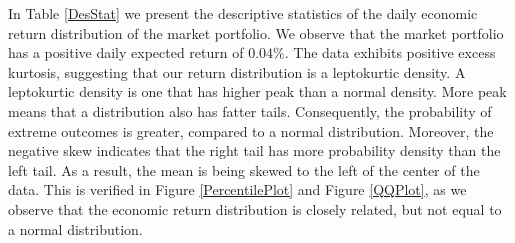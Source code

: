 In Table \ref{DesStat} we present the descriptive statistics of the daily economic return distribution of the market portfolio. We observe that the market portfolio has a positive daily expected return of $0.04\%$. The data exhibits positive excess kurtosis, suggesting that our return distribution is a leptokurtic density. A leptokurtic density is one that has higher peak than a normal density. More peak means that a distribution also has fatter tails. Consequently, the probability of extreme outcomes is greater, compared to a normal distribution. Moreover, the negative skew indicates that the right tail has more probability density than the left tail. As a result, the mean is being skewed to the left of the center of the data. This is verified in Figure \ref{PercentilePlot} and Figure \ref{QQPlot}, as we observe that the economic return distribution is closely related, but not equal to a normal distribution.  

